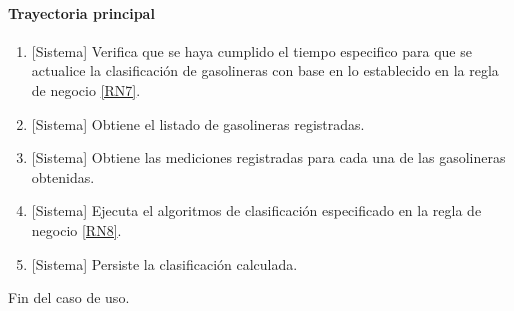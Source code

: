 \paragraph{Trayectoria principal}
	\begin{enumerate}
		\item {[Sistema]} Verifica que se haya cumplido el tiempo especifico para que se actualice la clasificación de gasolineras con base en lo establecido en la regla de negocio \ref{RN7}.
		\item {[Sistema]} Obtiene el listado de gasolineras registradas.
		\item {[Sistema]} Obtiene las mediciones registradas para cada una de las gasolineras obtenidas.
		\item {[Sistema]} Ejecuta el algoritmos de clasificación especificado en la regla de negocio \ref{RN8}.
		\item {[Sistema]} Persiste la clasificación calculada.
	\end{enumerate}
	Fin del caso de uso.


